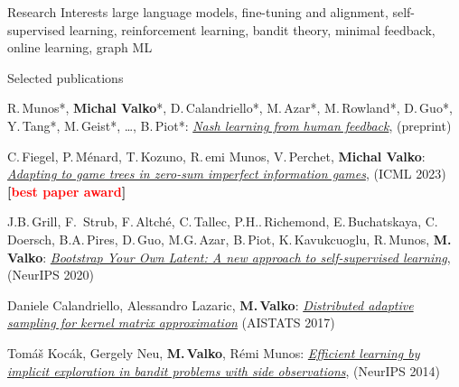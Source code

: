 \documentclass{resume}
\begin{document}
\vspace{-0.5cm}
\begin{category}{Research Interests}
\citemnobullet large language models, fine-tuning and alignment, self-supervised learning, 
reinforcement learning, bandit theory, minimal feedback, 
online learning, graph ML
\end{category}

\begin{category}{Selected publications}
\setlength\itemsep{0.1em}

\citembullet
R.\,Munos*, {\bf Michal Valko}*, D.\,Calandriello*, M.\,Azar*, M.\,Rowland*, D.\,Guo*, Y.\,Tang*, M.\,Geist*, \dots, B.\,Piot*:
\href{https://arxiv.org/pdf/2312.00886}{\emph{Nash learning from human feedback}},
({\sf preprint}) 

\citembullet
C.\,Fiegel, P.\,M\' enard, T.\,Kozuno, R.\,emi Munos, V.\,Perchet,  {\bf Michal Valko}:
\href{https://arxiv.org/pdf/2212.12567}{\emph{Adapting to game trees in zero-sum imperfect information games}},
({\sf ICML 2023}) 
{\bf [\textcolor{red}{best paper award}]}

\citembullet
J.B.\,Grill, F.\, Strub, F.\,Altch\' e, C.\,Tallec, P.H..\,Richemond, E.\,Buchatskaya, C.\,Doersch, B.A.\,Pires, D.\,Guo, M.G.\,Azar, B.\,Piot, K.\,Kavukcuoglu, R.\,Munos, {\bf M. Valko}:
\href{http://researchers.lille.inria.fr/~valko/hp/serve.php?what=publications/grill2020bootstrap}{\emph{Bootstrap Your Own Latent: A new approach to self-supervised learning}},
({\sf NeurIPS 2020}) 




\citembullet
Daniele Calandriello, Alessandro Lazaric, {\bf M.\,Valko}:
\href{http://researchers.lille.inria.fr/~valko/hp/serve.php?what=publications/calandriello2017distributed.pdf}
{\emph{Distributed adaptive sampling for kernel matrix approximation}}
({\sf AISTATS 2017}) 

\citembullet
Tom\'a\v s Koc\' ak, Gergely Neu, {\bf M.\,Valko}, R\' emi Munos:  
\href{http://researchers.lille.inria.fr/~valko/hp/serve.php?what=publications/kocak2014efficient.pdf}
{\emph{Efficient learning by implicit exploration in bandit problems with side observations}}, 
 ({\sf NeurIPS 2014})



\end{category}
\end{document}
